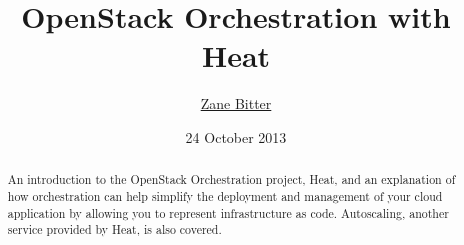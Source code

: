 \documentclass{tufte-handout}
\title{OpenStack Orchestration with Heat}
\author{\href{mailto:zbitter@redhat.com}{Zane Bitter}}
\date{24 October 2013}
\begin{document}
\maketitle

\marginnote{\tableofcontents \vspace{2em}}

\begin{abstract}
An introduction to the OpenStack Orchestration project, Heat, and an explanation of how orchestration can help simplify the deployment and management of your cloud application by allowing you to represent infrastructure as code. Autoscaling, another service provided by Heat, is also covered.
\end{abstract}








\end{document}
